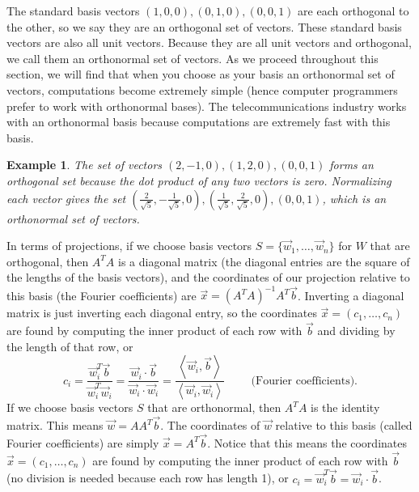 \documentclass[10pt]{article}
\theoremstyle{plain}
\theoremstyle{box}
\newtheorem{example}{Example}
\begin{document}
The standard basis vectors $(1,0,0),(0,1,0),(0,0,1)$ are each orthogonal to the other, so we say they are an orthogonal set of vectors.  These standard basis vectors are also all unit vectors. Because they are all unit vectors and orthogonal, we call them an orthonormal set of vectors. As we proceed throughout this section, we will find that when you choose as your basis an orthonormal set of vectors, computations become extremely simple (hence computer programmers prefer to work with orthonormal bases). The telecommunications industry works with an orthonormal basis because computations are extremely fast with this basis.

\begin{example}
The set of vectors $(2,-1,0), (1,2,0),(0,0,1)$ forms an orthogonal set because the dot product of any two vectors is zero.  Normalizing each vector gives the set $(\frac{2}{\sqrt5},-\frac{1}{\sqrt5},0), (\frac{1}{\sqrt5},\frac{2}{\sqrt5},0),(0,0,1)$, which is an orthonormal set of vectors.
\end{example}

In terms of projections, if we choose basis vectors $S =\{ \vec w_1,\ldots,  \vec w_n\}$ for $W$ that are orthogonal, then $A^T A$ is a diagonal matrix (the diagonal entries are the square of the lengths of the basis vectors), and the coordinates of our projection relative to this basis (the Fourier coefficients) are $\vec x = (A^T A)^{-1}A^T \vec b$. Inverting a diagonal matrix is just inverting each diagonal entry, so the coordinates $\vec x = (c_1, \ldots, c_n)$ are found by computing the inner product of each row with $\vec b$ and dividing by the length of that row, or 
$$c_i = \frac{\vec w_i^T\vec b}{\vec w_i^T\vec w_i} = \frac{\vec w_i\cdot \vec b}{\vec w_i\cdot \vec w_i} = \frac{\left<\vec w_i, \vec b\right>}{\left<\vec w_i, \vec w_i\right>}  \quad \quad \text{ (Fourier coefficients)}.$$
If we choose basis vectors $S$ that are orthonormal, then $A^TA$ is the identity matrix. This means $\vec w = AA^T\vec b$. The coordinates of $\vec w$ relative to this basis (called Fourier coefficients) are simply $\vec x = A^T \vec b$. Notice that this means the coordinates $\vec x = (c_1, \ldots, c_n)$ are found by computing the inner product of each row with $\vec b$ (no division is needed because each row has length 1), or $c_i = \vec w_i^T\vec b = \vec w_i\cdot \vec b$.
\end{document}
